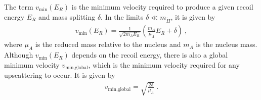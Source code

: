 \documentclass[aps,prd,amsmath,amssymb,10pt,letterpaper,balancelastpage,showpacs,superscriptaddress,nofootinbib,floatfix,notitlepage,longbibliography,twocolumn
]{revtex4-2}
\newcommand{\vmin}{v_{\text{min}}}
\newcommand{\vglobalmin}{v_{\text{min,global}}}
\newcommand{\mx}{m_{\Ht}}
\newcommand{\muA}{\mu_A}
\newcommand{\Ht}{\tilde{H}}
\begin{document}
The term $\vmin(E_R)$ is the minimum velocity required to produce a given recoil energy $E_R$ and mass splitting $\delta$. In the limits $\delta \ll \mx$, it is given by~\cite{Frontier}
\begin{align} \label{eq: vmin}
    \vmin(E_R) = \frac{1}{\sqrt{2 m_A E_R}} \left( \frac{m_A}{\muA} E_R + \delta \right) ~,
\end{align} 
where $\mu_A$ is the reduced mass relative to the nucleus and $m_A$ is the nucleus mass. Although $\vmin(E_R)$ depends on the recoil energy, there is also a global minimum velocity $\vglobalmin$, which is the minimum velocity required for any upscattering to occur. It is given by
\begin{align} \label{eq: vmin global}
    \vglobalmin = \sqrt{\frac{2 \delta}{\muA}} ~.
\end{align}
\end{document}
